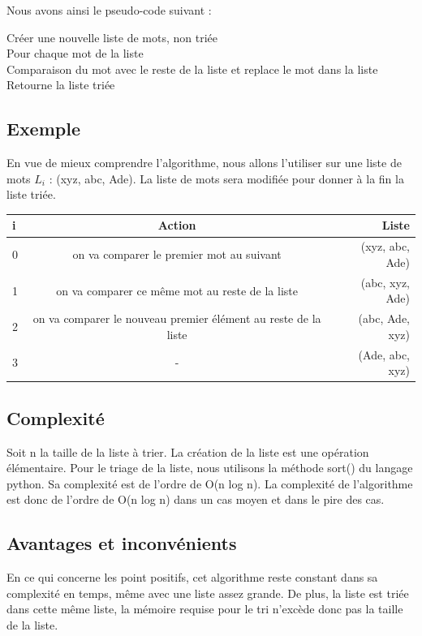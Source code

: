 \documentclass[11pt]{article}
\begin{document}
Nous avons ainsi le pseudo-code suivant :

\begin{tcolorbox}
Créer une nouvelle liste de mots, non triée \\
 

Pour chaque mot de la liste\\
\hspace*{1.0 cm} Comparaison du mot avec le reste de la liste et replace le mot dans la liste\\

Retourne la liste triée\\
\end{tcolorbox}

\subsection{Exemple}
\hspace{1.0 cm} En vue de mieux comprendre l'algorithme, nous allons l'utiliser sur une liste de mots $ L_{i} $ : (xyz, abc, Ade). La liste de mots sera modifiée pour donner à la fin la liste triée.

\vspace{0.5 cm}

\begin{tabular}{|l|c|r|}
  \hline
  i & Action & Liste \\
  \hline
  0 &		on va comparer le premier mot au suivant & (xyz, abc, Ade)\\
  1 &		on va comparer ce même mot au reste de la liste &	(abc, xyz, Ade)\\
  2 &		on va comparer le nouveau premier élément au reste de la liste &	(abc, Ade, xyz)\\
  3 &		 - &	(Ade, abc, xyz)\\
  \hline
\end{tabular}

\subsection{Complexité}
\hspace{1.0 cm} Soit n la taille de la liste à trier. La  création de la liste est une opération élémentaire. Pour le triage de la liste, nous utilisons la méthode sort() du langage python. Sa complexité est de l'ordre de O(n log n). La complexité de l'algorithme est donc de l'ordre de O(n log n) dans un cas moyen et dans le pire des cas.

\subsection{Avantages et inconvénients}
\hspace{1.0 cm} En ce qui concerne les point positifs, cet algorithme reste constant dans sa complexité en temps, même avec une liste assez grande. De plus, la liste est triée dans cette même liste, la mémoire requise pour le tri n'excède donc pas la taille de la liste.
\end{document}

